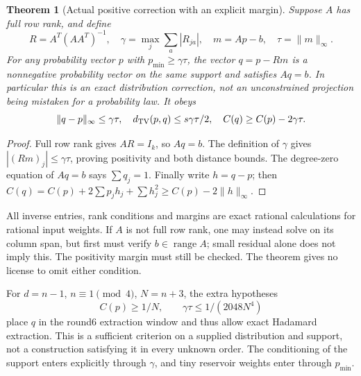 \documentclass[11pt]{article}
\newtheorem{theorem}{Theorem}[section]
\begin{document}
\begin{theorem}[Actual positive correction with an explicit margin]
Suppose $A$ has full row rank, and define
\[
 R=A^T(AA^T)^{-1},\quad
 \gamma=\max_j\sum_a|R_{ja}|,\quad
 m=Ap-b,\quad \tau=\|m\|_\infty.
\]
For any probability vector $p$ with $p_{\min}\ge\gamma\tau$, the
vector $q=p-Rm$ is a nonnegative probability vector on the same
support and satisfies $Aq=b$. In particular this is an exact
distribution correction, not an unconstrained projection being
mistaken for a probability law. It obeys
\[
 \|q-p\|_\infty\le\gamma\tau,\quad
 d_{\rm TV}(p,q)\le s\gamma\tau/2,\quad
 C(q)\ge C(p)-2\gamma\tau.
\]
\end{theorem}
\begin{proof}
Full row rank gives $AR=I_k$, so $Aq=b$. The definition of $\gamma$
gives $|(Rm)_j|\le\gamma\tau$, proving positivity and both distance
bounds. The degree-zero equation of $Aq=b$ says $\sum q_j=1$.
Finally write $h=q-p$; then
$C(q)=C(p)+2\sum p_jh_j+\sum h_j^2\ge C(p)-2\|h\|_\infty$.
\end{proof}
All inverse entries, rank conditions and margins are exact rational
calculations for rational input weights. If $A$ is not full row rank,
one may instead solve on its column span, but first must verify
$b\in\operatorname{range}A$; small residual alone does not imply this.
The positivity margin must still be checked. The theorem gives no
license to omit either condition.

For $d=n-1$, $n\equiv1\pmod4$, $N=n+3$, the extra hypotheses
\[
 C(p)\ge1/N,\qquad \gamma\tau\le1/(2048N^4)
\]
place $q$ in the round6 extraction window and thus allow exact
Hadamard extraction. This is a sufficient criterion on a supplied
distribution and support, not a construction satisfying it in every
unknown order. The conditioning of the support enters explicitly
through $\gamma$, and tiny reservoir weights enter through $p_{\min}$.
\end{document}
